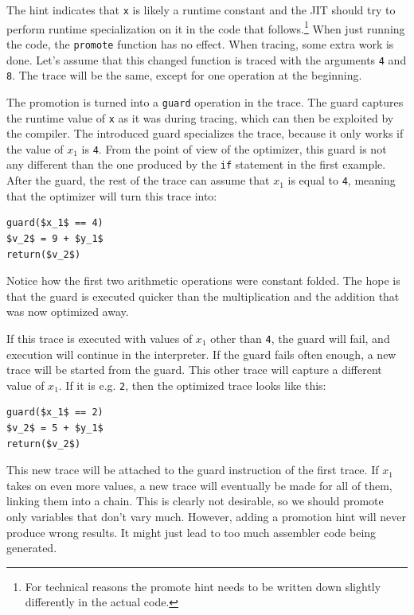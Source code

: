 \documentclass[preprint]{sigplanconf}
\newcommand{\noop}{}
\begin{document}
The hint indicates that \texttt{x} is likely a runtime constant and the JIT
should try to perform runtime specialization on it
in the code that follows.\footnote{For technical reasons the promote hint needs
to be written down slightly differently in the actual code.}  When just running
the code, the \texttt{promote} function has no
effect. When tracing, some extra work
is done. Let's assume that this changed function is traced with
the arguments \texttt{4} and \texttt{8}. The trace will be the same, except for one
operation at the beginning.

The promotion is turned into a \texttt{guard} operation in the trace. The guard
captures the runtime value of \texttt{x} as it was during tracing, which can
then be exploited by the compiler. The introduced
guard specializes the trace, because it only works if the value of $x_1$ is
\texttt{4}. From the point of view of the
optimizer, this guard is not any different than the one produced by the \texttt{if}
statement in the first example. After the guard, the rest of the trace can
assume that $x_1$ is equal to \texttt{4}, meaning that the optimizer will turn this
trace into:

{\noop
\begin{lstlisting}[mathescape,basicstyle=\ttfamily]
guard($x_1$ == 4)
$v_2$ = 9 + $y_1$
return($v_2$)
\end{lstlisting}
}

Notice how the first two arithmetic operations were constant folded. The hope is
that the guard is executed quicker than the multiplication and the addition that
was now optimized away.

If this trace is executed with values of $x_1$ other than \texttt{4}, the guard will
fail, and execution will continue in the interpreter. If the guard fails often
enough, a new trace will be started from the guard. This other trace will
capture a different value of $x_1$. If it is e.g. \texttt{2}, then the optimized
trace looks like this:

{\noop
\begin{lstlisting}[mathescape,basicstyle=\ttfamily]
guard($x_1$ == 2)
$v_2$ = 5 + $y_1$
return($v_2$)
\end{lstlisting}
}

This new trace will be attached to the guard instruction of the first trace. If
$x_1$ takes on even more values, a new trace will eventually be made for all of them,
linking them into a chain. This is clearly not desirable, so we should promote
only variables that don't vary much. However, adding a promotion hint will never produce wrong
results. It might just lead to too much assembler code being generated.
\end{document}
